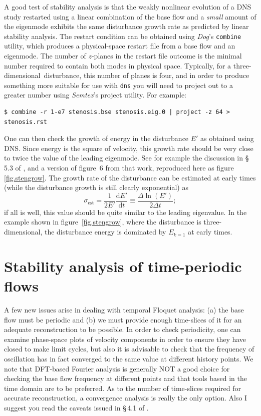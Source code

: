 \documentclass[11pt,a4paper]{report}
\newcommand\cd{\mathrm{d}}
\newcommand\threed{three-di\-men\-sion\-al}
\newcommand{\eg}{e.g.\ }
\newcommand{\Semtex}{\emph{Semtex}}
\newcommand{\Dog}{\emph{Dog}}
\begin{document}
A good test of stability analysis is that the weakly nonlinear
evolution of a DNS study restarted using a linear combination of the
base flow and a \emph{small} amount of the eigenmode exhibits the same
disturbance growth rate as predicted by linear stability analysis.  The
restart condition can be obtained using \Dog's \verb|combine| utility,
which produces a physical-space restart file from a base flow and an
eigenmode.  The number of $z$-planes in the restart file outcome is
the minimal number required to contain both modes in physical space.
Typically, for a \threed\ disturbance, this number of planes is four,
and in order to produce something more suitable for use with
\verb|dns| you will need to project out to a greater number using
\Semtex's project utility.  For example:
\begin{verbatim}
$ combine -r 1-e7 stenosis.bse stenosis.eig.0 | project -z 64 > stenosis.rst
\end{verbatim}

One can then check the growth of energy in the disturbance $E'$ as
obtained using DNS.  Since energy is the square of velocity, this
growth rate should be very close to twice the value of the leading
eigenmode.  See for example the discussion in \S\,5.3 of
\citet{shbl05}, and a version of figure~6 from that work, reproduced
here as figure\,\ref{fig.stengrow}.  The growth rate of the
disturbance can be estimated at early times (while the disturbance
growth is still clearly exponential) as
\begin{equation}
  \sigma_\text{est}  = \frac{1}{2E'}\frac{\cd E'}{\cd t} \equiv \frac{\Delta \ln(E')}{2\Delta t};
\end{equation}
if all is well, this value should be quite similar to the leading
eigenvalue.  In the example shown in figure~\ref{fig.stengrow}, where
the disturbance is \threed, the disturbance energy is dominated by
$E_{k=1}$ at early times.



\chapter{Stability analysis of time-periodic flows}
\label{ch.floquet}

A few new issues arise in dealing with temporal Floquet analysis: (a)
the base flow must be periodic and (b) we must provide enough
time-slices of it for an adequate reconstruction to be possible.  In
order to check periodicity, one can examine phase-space plots of
velocity components in order to ensure they have closed to make limit
cycles, but also it is advisable to check that the frequency of
oscillation has in fact converged to the same value at different
history points.  We note that DFT-based Fourier analysis is generally
NOT a good choice for checking the base flow frequency at different
points and that tools based in the time domain \citep[\eg
  zero-crossing analysis, see chapter~8 of][]{newland93} are to be
preferred. As to the number of time-slices required for accurate
reconstruction, a convergence analysis is really the only option.
Also I suggest you read the caveats issued in \S\,4.1 of
\citet{bbs08b}.
\end{document}
